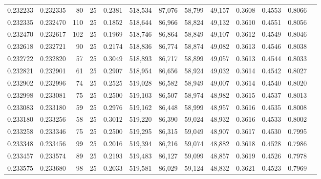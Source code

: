 \begin{tabular}{rrrrrrrrrrrrr}
0.232233 & 0.232335 &    80 &  25 &                                     0.2381 & 518,534 &  87,076 &  58,799 &  49,157 & 0.3608 & 0.4553 & 0.8066 \\
0.232335 & 0.232470 &   110 &  25 &                                     0.1852 & 518,644 &  86,966 &  58,824 &  49,132 & 0.3610 & 0.4551 & 0.8056 \\
0.232470 & 0.232617 &   102 &  25 &                                     0.1969 & 518,746 &  86,864 &  58,849 &  49,107 & 0.3612 & 0.4549 & 0.8046 \\
0.232618 & 0.232721 &    90 &  25 &                                     0.2174 & 518,836 &  86,774 &  58,874 &  49,082 & 0.3613 & 0.4546 & 0.8038 \\
0.232722 & 0.232820 &    57 &  25 &                                     0.3049 & 518,893 &  86,717 &  58,899 &  49,057 & 0.3613 & 0.4544 & 0.8033 \\
0.232821 & 0.232901 &    61 &  25 &                                     0.2907 & 518,954 &  86,656 &  58,924 &  49,032 & 0.3614 & 0.4542 & 0.8027 \\
0.232902 & 0.232996 &    74 &  25 &                                     0.2525 & 519,028 &  86,582 &  58,949 &  49,007 & 0.3614 & 0.4540 & 0.8020 \\
0.232998 & 0.233081 &    75 &  25 &                                     0.2500 & 519,103 &  86,507 &  58,974 &  48,982 & 0.3615 & 0.4537 & 0.8013 \\
0.233083 & 0.233180 &    59 &  25 &                                     0.2976 & 519,162 &  86,448 &  58,999 &  48,957 & 0.3616 & 0.4535 & 0.8008 \\
0.233180 & 0.233256 &    58 &  25 &                                     0.3012 & 519,220 &  86,390 &  59,024 &  48,932 & 0.3616 & 0.4533 & 0.8002 \\
0.233258 & 0.233346 &    75 &  25 &                                     0.2500 & 519,295 &  86,315 &  59,049 &  48,907 & 0.3617 & 0.4530 & 0.7995 \\
0.233348 & 0.233456 &    99 &  25 &                                     0.2016 & 519,394 &  86,216 &  59,074 &  48,882 & 0.3618 & 0.4528 & 0.7986 \\
0.233457 & 0.233574 &    89 &  25 &                                     0.2193 & 519,483 &  86,127 &  59,099 &  48,857 & 0.3619 & 0.4526 & 0.7978 \\
0.233575 & 0.233680 &    98 &  25 &                                     0.2033 & 519,581 &  86,029 &  59,124 &  48,832 & 0.3621 & 0.4523 & 0.7969 \\

\end{tabular}
